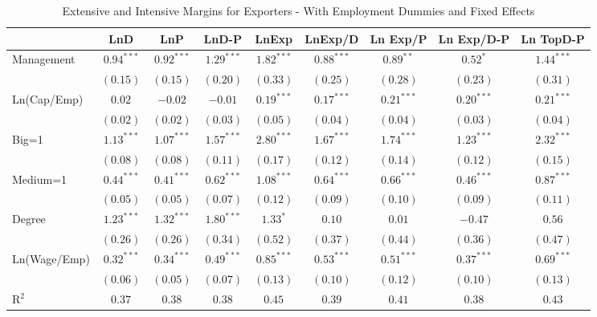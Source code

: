 \documentclass{article}
\begin{document}
\begin{table}
\caption{Extensive and Intensive Margins for Exporters - With Employment Dummies and Fixed Effects}
\begin{center}
\begin{small}
\begin{tabular}{l c c c c c c c c}
\hline
 & LnD & LnP & LnD-P & LnExp & LnExp/D & Ln Exp/P & Ln Exp/D-P & Ln TopD-P \\
\hline
Management   & $0.94^{***}$ & $0.92^{***}$ & $1.29^{***}$ & $1.82^{***}$ & $0.88^{***}$ & $0.89^{**}$  & $0.52^{*}$   & $1.44^{***}$ \\
             & $(0.15)$     & $(0.15)$     & $(0.20)$     & $(0.33)$     & $(0.25)$     & $(0.28)$     & $(0.23)$     & $(0.31)$     \\
Ln(Cap/Emp)  & $0.02$       & $-0.02$      & $-0.01$      & $0.19^{***}$ & $0.17^{***}$ & $0.21^{***}$ & $0.20^{***}$ & $0.21^{***}$ \\
             & $(0.02)$     & $(0.02)$     & $(0.03)$     & $(0.05)$     & $(0.04)$     & $(0.04)$     & $(0.03)$     & $(0.04)$     \\
Big=1        & $1.13^{***}$ & $1.07^{***}$ & $1.57^{***}$ & $2.80^{***}$ & $1.67^{***}$ & $1.74^{***}$ & $1.23^{***}$ & $2.32^{***}$ \\
             & $(0.08)$     & $(0.08)$     & $(0.11)$     & $(0.17)$     & $(0.12)$     & $(0.14)$     & $(0.12)$     & $(0.15)$     \\
Medium=1     & $0.44^{***}$ & $0.41^{***}$ & $0.62^{***}$ & $1.08^{***}$ & $0.64^{***}$ & $0.66^{***}$ & $0.46^{***}$ & $0.87^{***}$ \\
             & $(0.05)$     & $(0.05)$     & $(0.07)$     & $(0.12)$     & $(0.09)$     & $(0.10)$     & $(0.09)$     & $(0.11)$     \\
Degree       & $1.23^{***}$ & $1.32^{***}$ & $1.80^{***}$ & $1.33^{*}$   & $0.10$       & $0.01$       & $-0.47$      & $0.56$       \\
             & $(0.26)$     & $(0.26)$     & $(0.34)$     & $(0.52)$     & $(0.37)$     & $(0.44)$     & $(0.36)$     & $(0.47)$     \\
Ln(Wage/Emp) & $0.32^{***}$ & $0.34^{***}$ & $0.49^{***}$ & $0.85^{***}$ & $0.53^{***}$ & $0.51^{***}$ & $0.37^{***}$ & $0.69^{***}$ \\
             & $(0.06)$     & $(0.05)$     & $(0.07)$     & $(0.13)$     & $(0.10)$     & $(0.12)$     & $(0.10)$     & $(0.13)$     \\
\hline
R$^2$        & $0.37$       & $0.38$       & $0.38$       & $0.45$       & $0.39$       & $0.41$       & $0.38$       & $0.43$       \\

\end{tabular}
\end{small}
\end{center}
\end{table}
\end{document}
